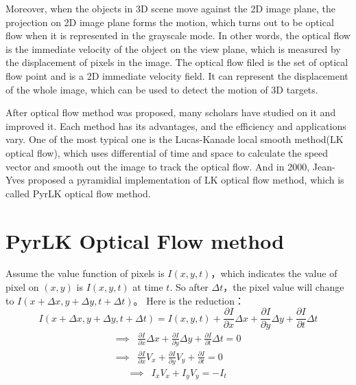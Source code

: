 Moreover, when the objects in 3D scene move against the 2D image plane, the projection on 2D image
plane forms the motion, which turns out to be optical flow when it is represented in the grayscale mode.
In other words, the optical flow is the immediate velocity of the object on the view plane, which is 
measured by the displacement of pixels in the image. The optical flow filed is the set of optical flow
point and is a 2D immediate velocity field. It can represent the displacement of the whole image, which
can be used to detect the motion of 3D targets.

After optical flow method was proposed, many scholars have studied on it and improved it. Each method has
its advantages, and the efficiency and applications vary. One of the most typical one is the Lucas-Kanade
local smooth method(LK optical flow)\cite{lk}, which uses differential of time and space to calculate the 
speed vector and smooth out the image to track the optical flow. And in 2000, Jean-Yves proposed a pyramidial
implementation of LK optical flow method, which is called PyrLK optical flow method\cite{pyrlk}.

\section{PyrLK Optical Flow method}
\label{subsec:pyrlk}
Assume the value function of pixels is $I(x,y,t)$，which indicates the value of pixel on $(x,y)$ is $I(x,y,t)$
at time $t$. So after $\Delta t$，the pixel value will change to $I(x+\Delta x,y+\Delta y, t+\Delta t)$。
Here is the reduction：\\
\[  I(x+\Delta x,y+\Delta y, t+\Delta t)=I(x,y,t) + \frac{\partial I}{\partial x}\Delta x 
		+ \frac{\partial I}{\partial y}\Delta y + \frac{\partial I}{\partial t}\Delta t \]
\begin{displaymath}
	\begin{array}{cc}
		\implies & \frac{\partial I}{\partial x}\Delta x 
		+ \frac{\partial I}{\partial y}\Delta y + \frac{\partial I}{\partial t}\Delta t = 0\\
		\implies & \frac{\partial I}{\partial x}V_x 
		+ \frac{\partial I}{\partial y}V_y + \frac{\partial I}{\partial t} = 0 
	\end{array}
\end{displaymath}
\begin{equation}\label{eq:opticalflow}
	\begin{array}{cc}
				\implies & I_xV_x + I_yV_y = -I_t
	\end{array}
\end{equation}

